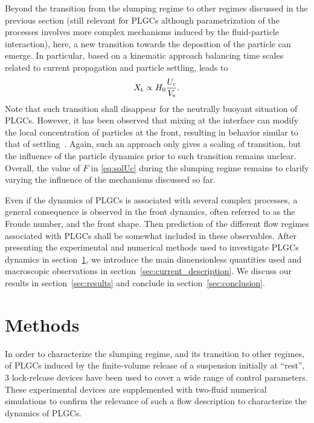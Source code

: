 \documentclass[12pt]{article}
\begin{document}
Beyond the transition from the slumping regime to other regimes discussed in the previous section (still relevant for PLGCs although parametrization of the processes involves more complex mechanisms induced by the fluid-particle interaction), here, a new transition towards the deposition of the particle can emerge. In particular, based on a kinematic approach balancing time scales related to current propagation and particle settling, leads to
%
\begin{equation}
	\label{eq:Xt_settling}
	X_{\text t} \propto H_0\frac{U_{\text{c}}}{V_{\text s}}.
\end{equation}
%
Note that such transition shall disappear for the neutrally buoyant situation of PLGCs.
However, it has been observed that mixing at the interface can modify the local concentration of particles at the front, resulting in behavior similar to that of settling~\cite{Schneider2023}. Again, such an approach only gives a scaling of transition, but the influence of the particle dynamics prior to such transition remains unclear. Overall, the value of $F$ in \eqref{eq:solUc} during the slumping regime remains to clarify varying the influence of the mechanisms discussed so far.

Even if the dynamics of PLGCs is associated with several complex processes, a general consequence is observed in the front dynamics, often referred to as the Froude number, and the front shape. Then prediction of the different flow regimes associated with PLGCs shall be somewhat included in these observables. After presenting the experimental and numerical methods used to investigate PLGCs dynamics in section~\ref{sec:methods}, we introduce the main dimensionless quantities used and macroscopic observations in section~\ref{sec:current_description}. We discuss our results in section~\ref{sec:results} and conclude in section~\ref{sec:conclusion}.

\section{Methods}
\label{sec:methods}

In order to characterize the slumping regime, and its transition to other regimes, of PLGCs induced by the finite-volume release of a suspension initially at ``rest'', 3 lock-release devices have been used to cover a wide range of control parameters. These experimental devices are supplemented with two-fluid numerical simulations to confirm the relevance of such a flow description to characterize the dynamics of PLGCs.
\end{document}
